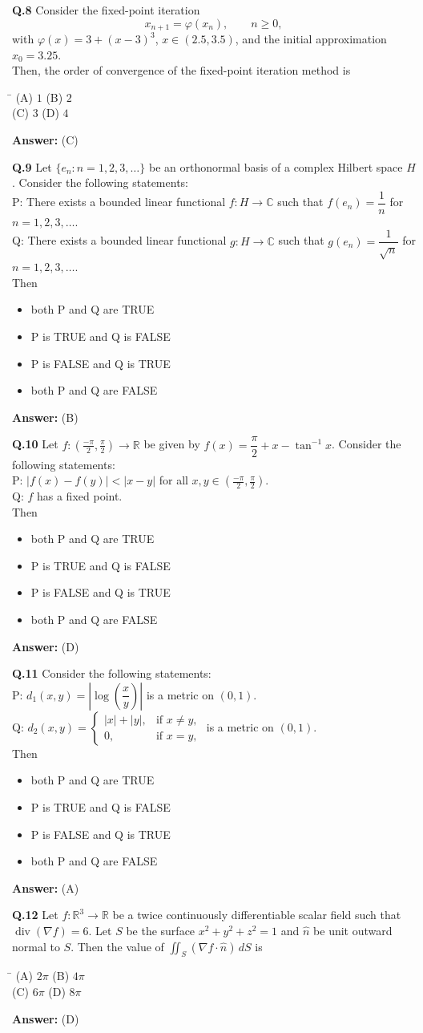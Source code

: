 \documentclass[11pt,a4paper]{article}
\newcommand{\optsfourA}[4]{%
  \begin{tabbing}
    \hspace{0.48\linewidth}\=\kill
    (A) #1 \> (B) #2 \\[2pt]
    (C) #3 \> (D) #4
  \end{tabbing}%
}
\newcommand{\optslistA}[4]{%
  \begin{itemize}
    \setlength{\itemsep}{2pt}\setlength{\parskip}{0pt}
    \item[(A)] #1
    \item[(B)] #2
    \item[(C)] #3
    \item[(D)] #4
  \end{itemize}%
}
\newcommand{\ans}[1]{\textbf{Answer:} #1\par\medskip}
\begin{document}
\textbf{Q.8} Consider the fixed-point iteration
\[
  x_{n+1} = \varphi(x_n), \qquad n \ge 0,
\]
with $\varphi(x) = 3 + (x - 3)^3$, $x \in (2.5, 3.5)$, and the initial approximation $x_0 = 3.25$.\\
Then, the order of convergence of the fixed-point iteration method is
\optsfourA{$1$}{$2$}{$3$}{$4$}
\ans{(C)}

\textbf{Q.9} Let $\{e_n : n = 1, 2, 3, \dots\}$ be an orthonormal basis of a complex Hilbert space $H$. Consider the following statements:\\
P: There exists a bounded linear functional $f : H \to \mathbb{C}$ such that $f(e_n) = \dfrac{1}{n}$ for $n = 1, 2, 3, \dots$.\\
Q: There exists a bounded linear functional $g : H \to \mathbb{C}$ such that $g(e_n) = \dfrac{1}{\sqrt{n}}$ for $n = 1, 2, 3, \dots$.\\
Then
\optslistA{both P and Q are TRUE}{P is TRUE and Q is FALSE}{P is FALSE and Q is TRUE}{both P and Q are FALSE}
\ans{(B)}

\textbf{Q.10} Let $f : \left(\frac{-\pi}{2}, \frac{\pi}{2}\right) \to \mathbb{R}$ be given by $f(x) = \dfrac{\pi}{2} + x - \tan^{-1} x$. Consider the following statements:\\
P: $|f(x) - f(y)| < |x - y|$ for all $x, y \in \left(\frac{-\pi}{2}, \frac{\pi}{2}\right)$.\\
Q: $f$ has a fixed point.\\
Then
\optslistA{both P and Q are TRUE}{P is TRUE and Q is FALSE}{P is FALSE and Q is TRUE}{both P and Q are FALSE}
\ans{(D)}

\textbf{Q.11} Consider the following statements:\\
P: $d_1(x, y) = \left|\log\!\left(\dfrac{x}{y}\right)\right|$ is a metric on $(0, 1)$.\\
Q: $d_2(x, y) = \begin{cases} |x| + |y|, & \text{if } x \neq y, \\ 0, & \text{if } x = y, \end{cases}$ is a metric on $(0, 1)$.\\
Then
\optslistA{both P and Q are TRUE}{P is TRUE and Q is FALSE}{P is FALSE and Q is TRUE}{both P and Q are FALSE}
\ans{(A)}

\textbf{Q.12} Let $f : \mathbb{R}^3 \to \mathbb{R}$ be a twice continuously differentiable scalar field such that $\operatorname{div}(\nabla f) = 6$. Let $S$ be the surface $x^2 + y^2 + z^2 = 1$ and $\hat{n}$ be unit outward normal to $S$. Then the value of $\displaystyle\iint_S (\nabla f \cdot \hat{n})\,dS$ is
\optsfourA{$2\pi$}{$4\pi$}{$6\pi$}{$8\pi$}
\ans{(D)}
\end{document}
